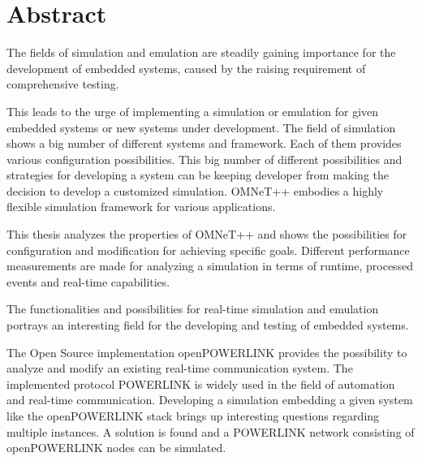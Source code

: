 \chapter{Abstract}

The fields of simulation and emulation are steadily gaining importance for the development of embedded systems, caused by the raising requirement of comprehensive testing.

This leads to the urge of implementing a simulation or emulation for given embedded systems or new systems under development.
The field of simulation shows a big number of different systems and framework.
Each of them provides various configuration possibilities.
This big number of different possibilities and strategies for developing a system can be keeping developer from making the decision to develop a customized simulation.
OMNeT++ embodies a highly flexible simulation framework for various applications.

This thesis analyzes the properties of OMNeT++ and shows the possibilities for configuration and modification for achieving specific goals.
Different performance measurements are made for analyzing a simulation in terms of runtime, processed events and real-time capabilities.

The functionalities and possibilities for real-time simulation and emulation portrays an interesting field for the developing and testing of embedded systems.

The Open Source implementation openPOWERLINK provides the possibility to analyze and modify an existing real-time communication system.
The implemented protocol POWERLINK is widely used in the field of automation and real-time communication.
Developing a simulation embedding a given system like the openPOWERLINK stack brings up interesting questions regarding multiple instances.
A solution is found and a POWERLINK network consisting of openPOWERLINK nodes can be simulated.


%
%
%
%
